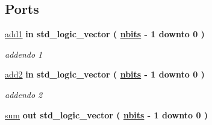 \subsection*{Ports}
 \begin{DoxyCompactItemize}
\item 
\hyperlink{group___adder_gad6ed6073f8ded668a403a0f7d85c53e8}{add1}  {\bfseries {\bfseries \textcolor{vhdlchar}{in}\textcolor{vhdlchar}{ }}} {\bfseries \textcolor{vhdlchar}{std\+\_\+logic\+\_\+vector}\textcolor{vhdlchar}{ }\textcolor{vhdlchar}{(}\textcolor{vhdlchar}{ }\textcolor{vhdlchar}{ }\textcolor{vhdlchar}{ }\textcolor{vhdlchar}{ }{\bfseries \hyperlink{group___adder_gae1435c07d0cd54b521535e2f8de6f94e}{nbits}} \textcolor{vhdlchar}{-\/}\textcolor{vhdlchar}{ } \textcolor{vhdldigit}{1} \textcolor{vhdlchar}{ }\textcolor{vhdlchar}{downto}\textcolor{vhdlchar}{ }\textcolor{vhdlchar}{ } \textcolor{vhdldigit}{0} \textcolor{vhdlchar}{ }\textcolor{vhdlchar}{)}\textcolor{vhdlchar}{ }} 
\begin{DoxyCompactList}\small\item\em addendo 1 \end{DoxyCompactList}\item 
\hyperlink{group___adder_gabf87ad241134c4d313c708910677575e}{add2}  {\bfseries {\bfseries \textcolor{vhdlchar}{in}\textcolor{vhdlchar}{ }}} {\bfseries \textcolor{vhdlchar}{std\+\_\+logic\+\_\+vector}\textcolor{vhdlchar}{ }\textcolor{vhdlchar}{(}\textcolor{vhdlchar}{ }\textcolor{vhdlchar}{ }\textcolor{vhdlchar}{ }\textcolor{vhdlchar}{ }{\bfseries \hyperlink{group___adder_gae1435c07d0cd54b521535e2f8de6f94e}{nbits}} \textcolor{vhdlchar}{-\/}\textcolor{vhdlchar}{ } \textcolor{vhdldigit}{1} \textcolor{vhdlchar}{ }\textcolor{vhdlchar}{downto}\textcolor{vhdlchar}{ }\textcolor{vhdlchar}{ } \textcolor{vhdldigit}{0} \textcolor{vhdlchar}{ }\textcolor{vhdlchar}{)}\textcolor{vhdlchar}{ }} 
\begin{DoxyCompactList}\small\item\em addendo 2 \end{DoxyCompactList}\item 
\hyperlink{group___adder_ga01f6ea3ddb4d1519676217bcb5959de8}{sum}  {\bfseries {\bfseries \textcolor{vhdlchar}{out}\textcolor{vhdlchar}{ }}} {\bfseries \textcolor{vhdlchar}{std\+\_\+logic\+\_\+vector}\textcolor{vhdlchar}{ }\textcolor{vhdlchar}{(}\textcolor{vhdlchar}{ }\textcolor{vhdlchar}{ }\textcolor{vhdlchar}{ }\textcolor{vhdlchar}{ }{\bfseries \hyperlink{group___adder_gae1435c07d0cd54b521535e2f8de6f94e}{nbits}} \textcolor{vhdlchar}{-\/}\textcolor{vhdlchar}{ } \textcolor{vhdldigit}{1} \textcolor{vhdlchar}{ }\textcolor{vhdlchar}{downto}\textcolor{vhdlchar}{ }\textcolor{vhdlchar}{ } \textcolor{vhdldigit}{0} \textcolor{vhdlchar}{ }\textcolor{vhdlchar}{)}\textcolor{vhdlchar}{ }} 

\end{DoxyCompactItemize}
